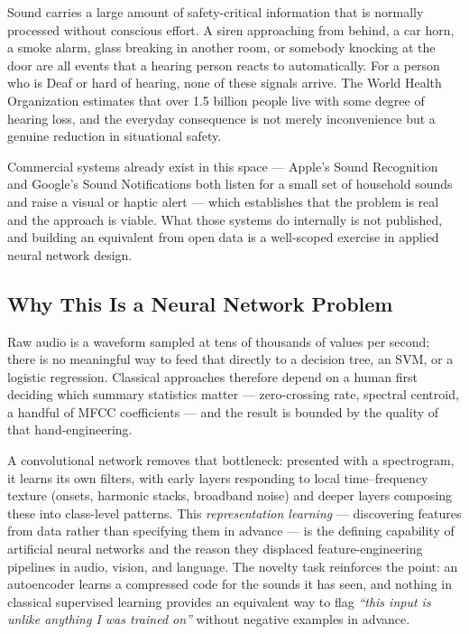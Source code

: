 \documentclass[11pt, a4paper]{article}
\begin{document}
Sound carries a large amount of safety-critical information that is normally processed without conscious effort. A siren approaching from behind, a car horn, a smoke alarm, glass breaking in another room, or somebody knocking at the door are all events that a hearing person reacts to automatically. For a person who is Deaf or hard of hearing, none of these signals arrive. The World Health Organization estimates that over 1.5 billion people live with some degree of hearing loss, and the everyday consequence is not merely inconvenience but a genuine reduction in situational safety.

Commercial systems already exist in this space --- Apple's Sound Recognition and Google's Sound Notifications both listen for a small set of household sounds and raise a visual or haptic alert --- which establishes that the problem is real and the approach is viable. What those systems do internally is not published, and building an equivalent from open data is a well-scoped exercise in applied neural network design.

\subsection{Why This Is a Neural Network Problem}

Raw audio is a waveform sampled at tens of thousands of values per second; there is no meaningful way to feed that directly to a decision tree, an SVM, or a logistic regression. Classical approaches therefore depend on a human first deciding which summary statistics matter --- zero-crossing rate, spectral centroid, a handful of MFCC coefficients --- and the result is bounded by the quality of that hand-engineering.

A convolutional network removes that bottleneck: presented with a spectrogram, it learns its own filters, with early layers responding to local time--frequency texture (onsets, harmonic stacks, broadband noise) and deeper layers composing these into class-level patterns. This \emph{representation learning} --- discovering features from data rather than specifying them in advance --- is the defining capability of artificial neural networks and the reason they displaced feature-engineering pipelines in audio, vision, and language. The novelty task reinforces the point: an autoencoder learns a compressed code for the sounds it has seen, and nothing in classical supervised learning provides an equivalent way to flag \emph{``this input is unlike anything I was trained on''} without negative examples in advance.
\end{document}
